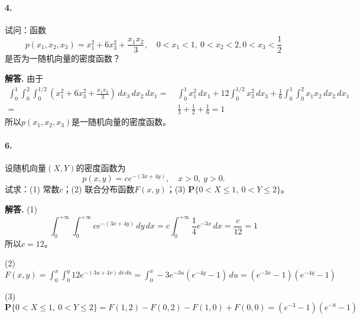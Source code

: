 \documentclass[12pt, a4paper, oneside]{ctexart}
\newenvironment{solution}{\par\noindent\textbf{解答. }}{\bigskip\par}
\begin{document}
\paragraph{4.}试问：函数
\begin{equation*}
    p(x_1,x_2,x_3)=x_1^2+6x_3^2+\frac{x_1x_2}{3},\quad 0 < x_1 < 1,\ 0 < x_2<2, 0 < x_3 < \frac{1}{2}
\end{equation*}
是否为一随机向量的密度函数？
\begin{solution}
    由于
    \begin{equation*}
        \begin{aligned}
            \int_0^1\int_0^2\int_0^{1/2}\left(x_1^2+6x_3^2+\frac{x_1x_2}{3}\right)\,dx_3\,dx_2\,dx_1 =&\  
            \int_0^1x_1^2\,dx_1+12\int_0^{1/2}x_3^2\,dx_3+\frac{1}{6}\int_0^1\int_0^2x_1x_2\,dx_2\,dx_1\\
            =&\ \frac{1}{3} + \frac{1}{2} + \frac{1}{6} = 1
        \end{aligned}
    \end{equation*}
    所以$p(x_1,x_2,x_3)$是一随机向量的密度函数。
\end{solution}
\def\P{\mathbf{P}}
\def\disp{\displaystyle}
\paragraph{6.}设随机向量$(X, Y)$的密度函数为
\begin{equation*}
    p(x, y) = ce^{-(3x+4y)},\quad x > 0,\ y > 0.
\end{equation*}
试求：(1) 常数$c$；(2) 联合分布函数$F(x, y)$；(3) $\P\{0<X\leqslant 1,\ 0< Y \leqslant 2\}$。
\begin{solution}
    (1)\begin{equation*}
        \int_0^{+\infty}\int_0^{+\infty}ce^{-(3x+4y)}\,dy\,dx = c\int_0^{+\infty}\frac{1}{4}e^{-3x}\,dx = \frac{c}{12} = 1
    \end{equation*}
    所以$ c = 12$。

    (2) $\disp F(x, y) = \int_0^x\int_0^y12e^{-(3u+4v)\,dv\,du} = \int_0^x-3e^{-3u}(e^{-4y}-1)\,du = (e^{-3x}-1)(e^{-4y}-1)$

    (3) $\disp \P\{0<X\leqslant 1,\ 0< Y \leqslant 2\} = F(1, 2) - F(0, 2)- F(1, 0)+ F(0,0) = (e^{-3}-1)(e^{-8}-1)$
\end{solution}
\end{document}
